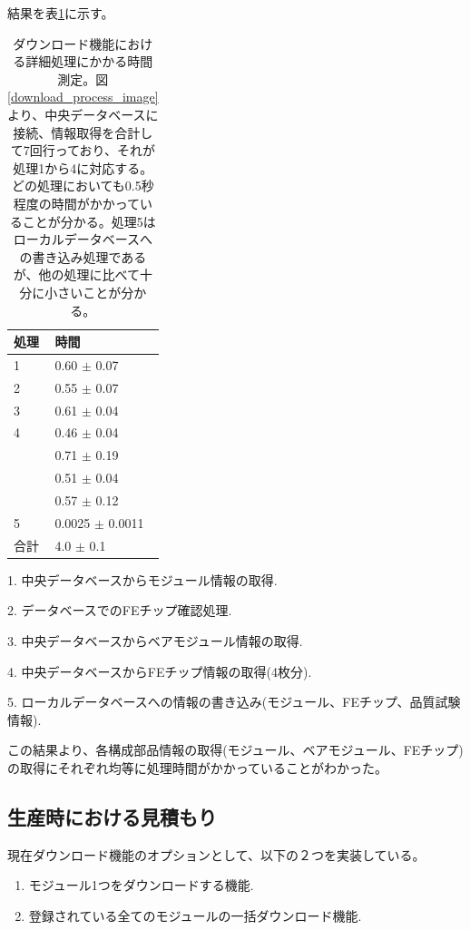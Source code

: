 結果を表\ref{download_process_details}に示す。
\begin{table}[tbp]
\begin{center}
\caption[ダウンロード機能における詳細処理にかかる時間測定]{ダウンロード機能における詳細処理にかかる時間測定。図\ref{download_process_image}より、中央データベースに接続、情報取得を合計して7回行っており、それが処理1から4に対応する。どの処理においても0.5秒程度の時間がかかっていることが分かる。処理5はローカルデータベースへの書き込み処理であるが、他の処理に比べて十分に小さいことが分かる。}
\label{download_process_details}
  \begin{tabular}{|ll|} \hline
    処理 & 時間 \\ \hline
    1 &  0.60 $\pm$ 0.07 \\ 
    2 &  0.55 $\pm$ 0.07 \\ 
    3 &  0.61 $\pm$ 0.04 \\ 
    4 &  0.46 $\pm$ 0.04 \\ 
      &  0.71 $\pm$ 0.19 \\ 
      &  0.51 $\pm$ 0.04 \\ 
      &  0.57 $\pm$ 0.12 \\ 
    5 &  0.0025 $\pm$ 0.0011 \\ 
    合計 & 4.0 $\pm$ 0.1 \\ \hline
  \end{tabular}
  \scriptsize
  \begin{tablenotes}
    \item[1] 1. 中央データベースからモジュール情報の取得.
    \item[2] 2. データベースでのFEチップ確認処理.
    \item[3] 3. 中央データベースからベアモジュール情報の取得.
    \item[4] 4. 中央データベースからFEチップ情報の取得(4枚分).
    \item[5] 5. ローカルデータベースへの情報の書き込み(モジュール、FEチップ、品質試験情報).
  \end{tablenotes}
\end{center}
\end{table}

この結果より、各構成部品情報の取得(モジュール、ベアモジュール、FEチップ)の取得にそれぞれ均等に処理時間がかかっていることがわかった。

\subsection{生産時における見積もり}
現在ダウンロード機能のオプションとして、以下の２つを実装している。
\begin{enumerate}
  \item モジュール1つをダウンロードする機能.
  \item 登録されている全てのモジュールの一括ダウンロード機能.
\end{enumerate}

